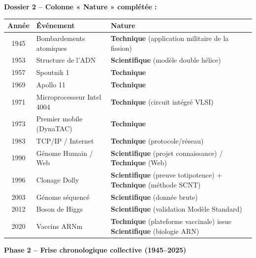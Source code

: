 \documentclass[11pt]{article}
\begin{document}
\begin{exoresolu}
\medskip
\noindent \textbf{Dossier 2 -- Colonne « Nature » complétée :}
\begin{center}
\begin{tabularx}{\linewidth}{|c|l|X|}\hline
\textbf{Année} & \textbf{Événement} & \textbf{Nature} \\ \hline
1945 & Bombardements atomiques & \textbf{Technique} (application militaire de la fission) \\ \hline
1953 & Structure de l'ADN & \textbf{Scientifique} (modèle double hélice) \\ \hline
1957 & Spoutnik 1 & \textbf{Technique} \\ \hline
1969 & Apollo 11 & \textbf{Technique} \\ \hline
1971 & Microprocesseur Intel 4004 & \textbf{Technique} (circuit intégré VLSI) \\ \hline
1973 & Premier mobile (DynaTAC) & \textbf{Technique} \\ \hline
1983 & TCP/IP / Internet & \textbf{Technique} (protocole/réseau) \\ \hline
1990 & Génome Humain / Web & \textbf{Scientifique} (projet connaissance) / \textbf{Technique} (Web) \\ \hline
1996 & Clonage Dolly & \textbf{Scientifique} (preuve totipotence) + \textbf{Technique} (méthode SCNT) \\ \hline
2003 & Génome séquencé & \textbf{Scientifique} (donnée brute) \\ \hline
2012 & Boson de Higgs & \textbf{Scientifique} (validation Modèle Standard) \\ \hline
2020 & Vaccins ARNm & \textbf{Technique} (plateforme vaccinale) issue \textbf{Scientifique} (biologie ARN) \\ \hline
\end{tabularx}
\end{center}

\medskip
\noindent \textbf{Phase 2 -- Frise chronologique collective (1945--2025)}

\begin{popfigure}
\end{popfigure}
\end{exoresolu}
\end{document}
